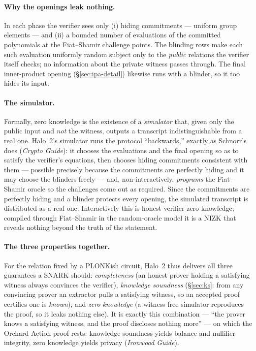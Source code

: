 \documentclass[11pt,a4paper]{article}
\theoremstyle{definition}
\begin{document}
\paragraph{Why the openings leak nothing.} In each phase the verifier sees only
(i) hiding commitments --- uniform group elements --- and (ii) a bounded number of
evaluations of the committed polynomials at the Fiat--Shamir challenge points. The
blinding rows make each such evaluation uniformly random subject only to the
\emph{public} relations the verifier itself checks; no information about the
private witness passes through. The final inner-product opening
(\S\ref{sec:ipa-detail}) likewise runs with a blinder, so it too hides its
input.

\paragraph{The simulator.} Formally, zero knowledge is the existence of a
\emph{simulator} that, given only the public input and \emph{not} the witness,
outputs a transcript indistinguishable from a real one. Halo~2's simulator runs
the protocol ``backwards,'' exactly as Schnorr's does (\emph{Crypto Guide}): it
chooses the evaluations and the final opening so as to satisfy the verifier's
equations, then chooses hiding commitments consistent with them --- possible
precisely because the commitments are perfectly hiding and it may choose the blinders
freely --- and, non-interactively, \emph{programs} the Fiat--Shamir oracle so
the challenges come out as required. Since the commitments are perfectly hiding
and a blinder protects every opening, the simulated transcript is distributed as a real
one. Interactively this is honest-verifier zero knowledge; compiled through
Fiat--Shamir in the random-oracle model it is a NIZK that reveals nothing beyond
the truth of the statement.

\paragraph{The three properties together.} For the relation fixed by a PLONKish
circuit, Halo~2 thus delivers all three guarantees a SNARK should:
\emph{completeness} (an honest prover holding a satisfying witness always
convinces the verifier), \emph{knowledge soundness} (\S\ref{sec:ks}: from any
convincing prover an extractor pulls a satisfying witness, so an accepted proof
certifies one is \emph{known}), and \emph{zero knowledge} (a witness-free
simulator reproduces the proof, so it leaks nothing else). It is exactly this
combination --- ``the prover knows a satisfying witness, and the proof discloses
nothing more'' --- on which the Orchard Action proof rests: knowledge soundness
yields balance and nullifier integrity, zero knowledge yields privacy
(\emph{Ironwood Guide}).
\end{document}
